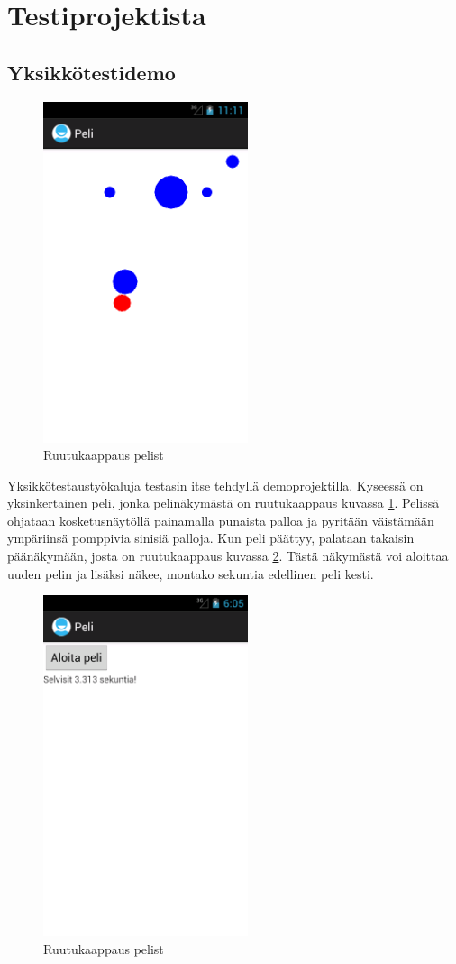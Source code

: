 \section{Testiprojektista}

\subsection{Yksikkötestidemo}

\begin{figure}[htb]
\includegraphics[width=60mm]{peli_screenshot.png}
\caption{Ruutukaappaus pelist} \label{peli_screenshot}
\end{figure}

Yksikkötestaustyökaluja testasin itse tehdyllä demoprojektilla. Kyseessä on yksinkertainen peli, jonka pelinäkymästä on ruutukaappaus kuvassa \ref{peli_screenshot}. Pelissä ohjataan kosketusnäytöllä painamalla punaista palloa ja pyritään väistämään ympäriinsä pomppivia sinisiä palloja. Kun peli päättyy, palataan takaisin päänäkymään, josta on ruutukaappaus kuvassa \ref{mainactivity}. Tästä näkymästä voi aloittaa uuden pelin ja lisäksi näkee, montako sekuntia edellinen peli kesti.

\begin{figure}[htb]
\includegraphics[width=60mm]{peli_mainactivity.png}
\caption{Ruutukaappaus pelist} \label{mainactivity}
\end{figure}

